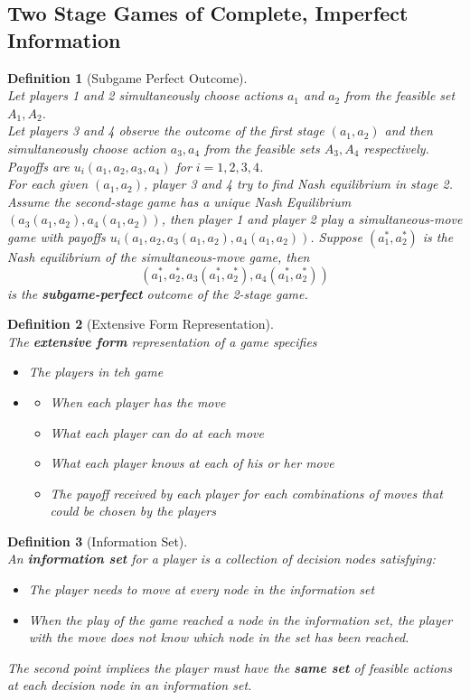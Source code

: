 \documentclass[12pt]{article}
\newtheorem{definition}{Definition}[section]
\theoremstyle{definition}
\begin{document}
\subsection{Two Stage Games of Complete, Imperfect Information}
\begin{definition}[Subgame Perfect Outcome]
\hfill\\\normalfont 
Let players 1 and 2 simultaneously choose actions $a_1$ and $a_2$ from the feasible set $A_1, A_2$.\\
Let players 3 and 4 observe the outcome of the first stage $(a_1,a_2)$ and then simultaneously choose action $a_3, a_4$ from the feasible sets $A_3, A_4$ respectively.\\
Payoffs are $u_i(a_1,a_2,a_3,a_4)$ for $i=1,2,3,4$.\\
For each given $(a_1, a_2)$, player 3 and 4 try to find Nash equilibrium in stage 2. Assume the second-stage game has a unique Nash Equilibrium $(a_3(a_1, a_2), a_4(a_1,a_2))$, then player 1 and player 2 play a simultaneous-move game with payoffs $u_i(a_1,a_2,a_3(a_1,a_2), a_4(a_1,a_2))$. Suppose $(a_1^\ast, a_2^\ast)$ is the Nash equilibrium of the simultaneous-move game, then
\[
(a_1^\ast, a_2^\ast, a_3(a_1^\ast, a_2^\ast), a_4(a_1^\ast, a_2^\ast))
\]
is the \textbf{subgame-perfect} outcome of the 2-stage game.
\end{definition}
\begin{definition}[Extensive Form Representation]
\hfill\\\normalfont The \textbf{extensive form} representation of a game specifies
\begin{itemize}
  \item The players in teh game
  \item \begin{itemize}
  \item When each player has the move
  \item What each player can do at each move
  \item What each player knows at each of his or her move
  \item The payoff received by each player for each combinations of moves that could be chosen by the players
  \end{itemize}
\end{itemize}
\end{definition}
\begin{definition}[Information Set]
\hfill\\\normalfont An \textbf{information set} for a player is a collection of decision nodes satisfying:
\begin{itemize}
  \item The player needs to move at every node in the information set
  \item When the play of the game reached a node in the information set, the player with the move does not know which node in the set has been reached.
\end{itemize}
The second point impliees the player must have the \textbf{same set} of feasible actions at each decision node in an information set.
\end{definition}
\end{document}
